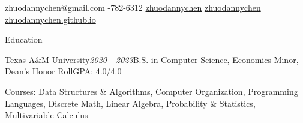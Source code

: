\documentclass{resume} %
\begin{document}
\begin{center}
    \small \faEnvelope \space zhuodannychen@gmail.com \hspace{0.1cm}
    \faPhone {}-782-6312 \hspace{0.1cm}
    \faGithub \space \href{https://github.com/zhuodannychen}{zhuodannychen} \hspace{0.1cm}
    \faLinkedinSquare \space \href{https://www.linkedin.com/in/zhuodannychen/}{zhuodannychen} \hspace{0.1cm}
    \faLink \space \href{https://zhuodannychen.github.io/}{zhuodannychen.github.io}
\end{center}





\begin{rSection}{Education}
\begin{rSubsection}{Texas A\&M University}{\it 2020 - 2023}{B.S. in Computer Science, Economics Minor, Dean's Honor Roll}{GPA: 4.0/4.0}
    \item Courses: Data Structures \& Algorithms, Computer Organization, Programming Languages, Discrete Math, Linear Algebra,
    Probability \& Statistics, Multivariable Calculus
\end{rSubsection}
\end{rSection}



\end{document}
